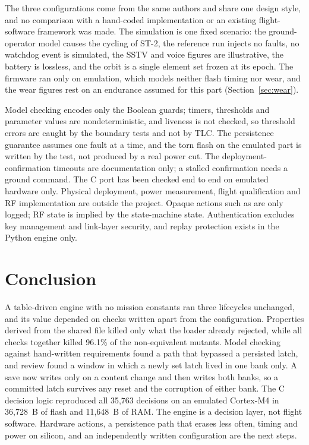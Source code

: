 \documentclass[preprint,12pt]{elsarticle}
\begin{document}
The three configurations come from the same authors and share one design style, and no comparison with a hand-coded implementation or an existing flight-software framework was made. The simulation is one fixed scenario: the ground-operator model causes the cycling of ST-2, the reference run injects no faults, no watchdog event is simulated, the SSTV and voice figures are illustrative, the battery is lossless, and the orbit is a single element set frozen at its epoch. The firmware ran only on emulation, which models neither flash timing nor wear, and the wear figures rest on an endurance assumed for this part (Section~\ref{sec:wear}).

Model checking encodes only the Boolean guards; timers, thresholds and parameter values are nondeterministic, and liveness is not checked, so threshold errors are caught by the boundary tests and not by TLC. The persistence guarantee assumes one fault at a time, and the torn flash on the emulated part is written by the test, not produced by a real power cut. The deployment-confirmation timeouts are documentation only; a stalled confirmation needs a ground command. The C port has been checked end to end on emulated hardware only. Physical deployment, power measurement, flight qualification and RF implementation are outside the project. Opaque actions such as  are only logged; RF state is implied by the state-machine state. Authentication excludes key management and link-layer security, and replay protection exists in the Python engine only.

\section{Conclusion}\label{sec:conclusion}

A table-driven engine with no mission constants ran three lifecycles unchanged, and its value depended on checks written apart from the configuration. Properties derived from the shared file killed only what the loader already rejected, while all checks together killed 96.1\% of the non-equivalent mutants. Model checking against hand-written requirements found a path that bypassed a persisted latch, and review found a window in which a newly set latch lived in one bank only. A save now writes only on a content change and then writes both banks, so a committed latch survives any reset and the corruption of either bank. The C decision logic reproduced all 35,763 decisions on an emulated Cortex-M4 in 36,728~B of flash and 11,648~B of RAM. The engine is a decision layer, not flight software. Hardware actions, a persistence path that erases less often, timing and power on silicon, and an independently written configuration are the next steps.
\end{document}
